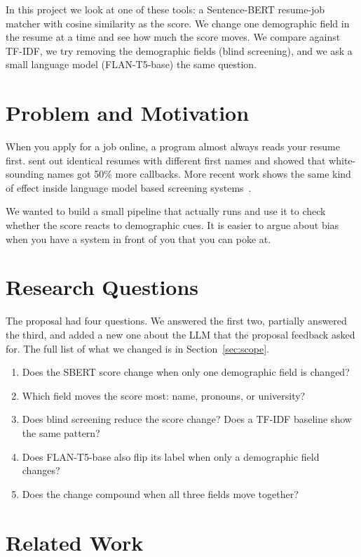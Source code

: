 \documentclass{article}
\begin{document}
In this project we look at one of these tools: a Sentence-BERT resume-job matcher with cosine similarity as the score. We change one demographic field in the resume at a time and see how much the score moves. We compare against TF-IDF, we try removing the demographic fields (blind screening), and we ask a small language model (FLAN-T5-base) the same question.

\section{Problem and Motivation}

When you apply for a job online, a program almost always reads your resume first. \citet{bertrand2004emily} sent out identical resumes with different first names and showed that white-sounding names got 50\% more callbacks. More recent work shows the same kind of effect inside language model based screening systems~\cite{wilson2024gender}.

We wanted to build a small pipeline that actually runs and use it to check whether the score reacts to demographic cues. It is easier to argue about bias when you have a system in front of you that you can poke at.

\section{Research Questions}

The proposal had four questions. We answered the first two, partially answered the third, and added a new one about the LLM that the proposal feedback asked for. The full list of what we changed is in Section~\ref{sec:scope}.

\begin{enumerate}
    \item Does the SBERT score change when only one demographic field is changed?
    \item Which field moves the score most: name, pronouns, or university?
    \item Does blind screening reduce the score change? Does a TF-IDF baseline show the same pattern?
    \item Does FLAN-T5-base also flip its label when only a demographic field changes?
    \item Does the change compound when all three fields move together?
\end{enumerate}

\section{Related Work}
\end{document}
